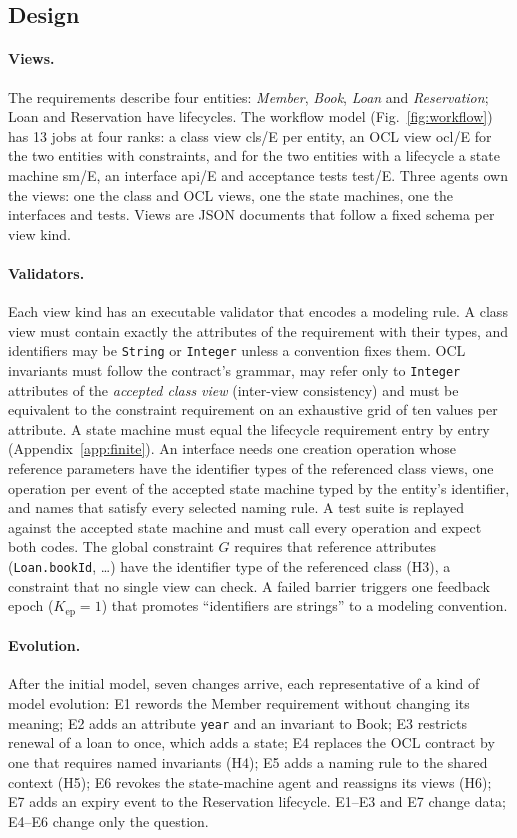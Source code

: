 \documentclass[pdflatex,sn-mathphys-num]{sn-jnl}
\theoremstyle{thmstyleone}%
\theoremstyle{thmstyletwo}%
\theoremstyle{thmstylethree}%
\newcommand{\vw}[1]{\textsf{#1}}
\begin{document}
\subsection{Design}\label{sec:case-design}
\paragraph{Views.} The requirements describe four entities: \emph{Member}, \emph{Book}, \emph{Loan} and \emph{Reservation}; Loan and Reservation have lifecycles. The workflow model (Fig.~\ref{fig:workflow}) has 13 jobs at four ranks: a class view \vw{cls/E} per entity, an OCL view \vw{ocl/E} for the two entities with constraints, and for the two entities with a lifecycle a state machine \vw{sm/E}, an interface \vw{api/E} and acceptance tests \vw{test/E}. Three agents own the views: one the class and OCL views, one the state machines, one the interfaces and tests. Views are JSON documents that follow a fixed schema per view kind.

\paragraph{Validators.} Each view kind has an executable validator that encodes a modeling rule. A class view must contain exactly the attributes of the requirement with their types, and identifiers may be \texttt{String} or \texttt{Integer} unless a convention fixes them. OCL invariants must follow the contract's grammar, may refer only to \texttt{Integer} attributes of the \emph{accepted class view} (inter-view consistency) and must be equivalent to the constraint requirement on an exhaustive grid of ten values per attribute. A state machine must equal the lifecycle requirement entry by entry (Appendix~\ref{app:finite}). An interface needs one creation operation whose reference parameters have the identifier types of the referenced class views, one operation per event of the accepted state machine typed by the entity's identifier, and names that satisfy every selected naming rule. A test suite is replayed against the accepted state machine and must call every operation and expect both codes. The global constraint $G$ requires that reference attributes (\texttt{Loan.bookId}, \ldots) have the identifier type of the referenced class (H3), a constraint that no single view can check. A failed barrier triggers one feedback epoch ($K_{\mathrm{ep}}=1$) that promotes ``identifiers are strings'' to a modeling convention.

\paragraph{Evolution.} After the initial model, seven changes arrive, each representative of a kind of model evolution: E1 rewords the Member requirement without changing its meaning; E2 adds an attribute \texttt{year} and an invariant to Book; E3 restricts renewal of a loan to once, which adds a state; E4 replaces the OCL contract by one that requires named invariants (H4); E5 adds a naming rule to the shared context (H5); E6 revokes the state-machine agent and reassigns its views (H6); E7 adds an expiry event to the Reservation lifecycle. E1--E3 and E7 change data; E4--E6 change only the question.
\end{document}
